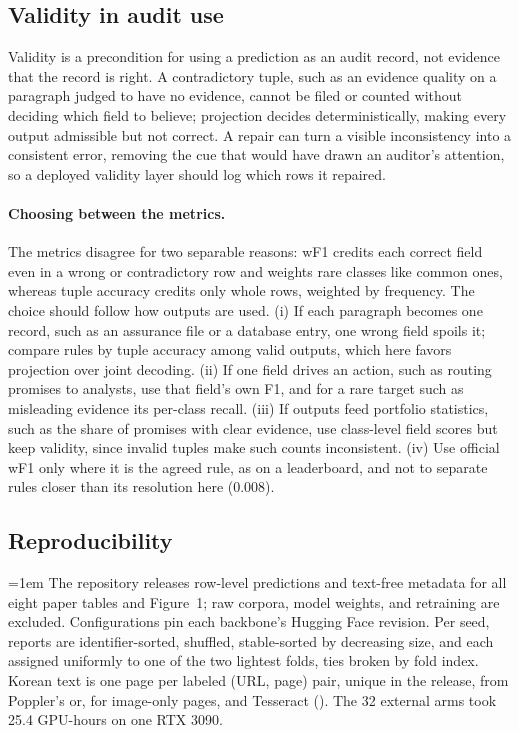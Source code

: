 \subsection{Validity in audit use}
\label{sec:audit}
Validity is a precondition for using a prediction as an audit record, not
evidence that the record is right. A contradictory tuple, such as an evidence
quality on a paragraph judged to have no evidence, cannot be filed or counted
without deciding which field to believe; projection decides deterministically,
making every output admissible but not correct. A repair can turn a visible
inconsistency into a consistent error, removing the cue that would have drawn
an auditor's attention, so a deployed validity layer should log which rows it
repaired.

\paragraph{Choosing between the metrics.} The metrics disagree for two
separable reasons: wF1 credits each correct field even in a wrong or
contradictory row and weights rare classes like common ones, whereas tuple
accuracy credits only whole rows, weighted by frequency. The choice should
follow how outputs are used. (i) If each paragraph becomes one record, such as
an assurance file or a database entry, one wrong field spoils it; compare
rules by tuple accuracy among valid outputs, which here favors projection over
joint decoding. (ii) If one field drives an action, such as routing promises to
analysts, use that field's own F1, and for a rare target such as misleading
evidence its per-class recall. (iii) If outputs feed portfolio statistics,
such as the share of promises with clear evidence, use class-level field
scores but keep validity, since invalid tuples make such counts inconsistent.
(iv) Use official wF1 only where it is the agreed rule, as on a leaderboard,
and not to separate rules closer than its resolution here (0.008).

\subsection{Reproducibility}
\label{sec:repro}
\begingroup\emergencystretch=1em
The repository releases row-level predictions and text-free metadata for all
eight paper tables and Figure~1; raw corpora, model weights, and retraining are
excluded. Configurations pin each backbone's Hugging Face revision. Per seed, reports are identifier-sorted, shuffled,
stable-sorted by decreasing size, and each assigned uniformly to one of the two
lightest folds, ties broken by fold index. Korean text is one page per labeled
(URL, page) pair, unique in the release, from Poppler's
 or, for image-only pages,
 and Tesseract (). The 32 external arms
took 25.4 GPU-hours on one RTX 3090.
\par\endgroup

